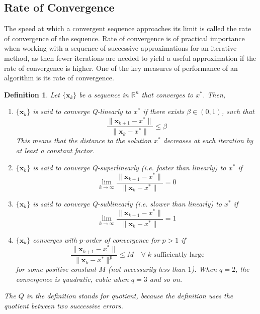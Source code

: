 \documentclass[12pt]{report}
\newtheorem{defn}{Definition}[section]
\numberwithin{equation}{section}
\begin{document}
\subsection{Rate of Convergence}
The speed at which a convergent sequence approaches its limit is called the rate of convergence of the sequence. Rate of convergence is of practical importance when working with a sequence of successive approximations for an iterative method, as then fewer iterations are needed to yield a useful approximation if the rate of convergence is higher. One of the key measures of performance of an algorithm is its rate of convergence. 
\begin{defn}
\normalfont
Let $\{\bm{x}_k\}$ be a sequence in $\mathbb{R}^n$ that converges to $x^*$. Then,
\begin{enumerate}[label=\roman*)]
\item $\{\bm{x}_k\}$ is said to converge {Q-linearly} to $x^*$ if there exists $\beta \in (0,1)$, such that 
\[
\frac{\|\bm{x}_{k+1}-x^*\|}{\|\bm{x}_{k}-x^*\|} \leq \beta 
\]
This means that the distance to the solution $x^*$ decreases at each iteration by at least a constant factor.
\item $\{\bm{x}_k\}$ is said to converge {Q-superlinearly} (i.e. faster than linearly) to $x^*$ if  
\[
\lim_{k\rightarrow\infty} \frac{\|\bm{x}_{k+1}-x^*\|}{\|\bm{x}_{k}-x^*\|} = 0
\]
\item $\{\bm{x}_k\}$ is said to converge {Q-sublinearly} (i.e. slower than linearly) to $x^*$ if  
\[
\lim_{k\rightarrow\infty} \frac{\|\bm{x}_{k+1}-x^*\|}{\|\bm{x}_{k}-x^*\|} = 1
\]
\item $\{\bm{x}_k\}$ converges with $p$-order of convergence  for $p>1$ if  
\[
\ \frac{\|\bm{x}_{k+1}-x^*\|}{\|\bm{x}_{k}-x^*\|^p} \leq M \quad \forall \; k \text{ sufficiently large}
\]
for some positive constant $M$ (not necessarily less than $1$). When $q=2$, the convergence is quadratic, cubic when $q=3$ and so on. 
\end{enumerate}
The $Q$ in the definition stands for quotient, because the definition uses the quotient between two successive errors. 
\end{defn}
\end{document}
